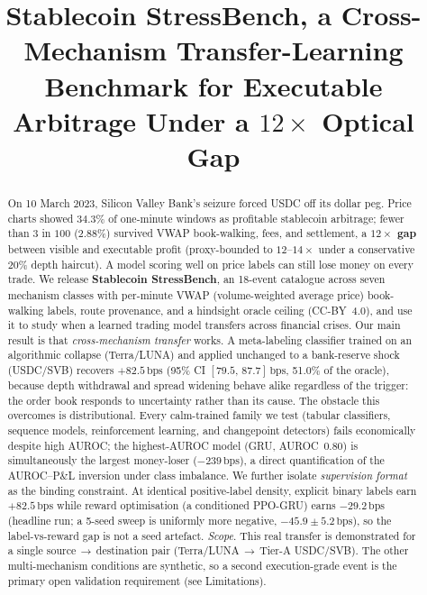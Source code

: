 \documentclass[sigconf,anonymous,natbib=false]{acmart}
\newcommand{\bps}{\,\text{bps}}
\begin{document}
\title{Stablecoin StressBench, a Cross-Mechanism Transfer-Learning\\
       Benchmark for Executable Arbitrage Under a \texorpdfstring{$12\times$}{12x} Optical Gap}

\begin{abstract}\sloppy
On 10 March 2023, Silicon Valley Bank's seizure forced USDC off its
dollar peg. Price charts showed $34.3\%$ of one-minute windows as
profitable stablecoin arbitrage; fewer than $3$ in $100$ ($2.88\%$)
survived VWAP book-walking, fees, and settlement, a \textbf{$12\times$
gap} between visible and executable profit (proxy-bounded to $12$--$14\times$
under a conservative $20\%$ depth haircut).  A model scoring well on
price labels can still lose money on every trade.
We release \textbf{Stablecoin StressBench}, an 18-event catalogue across
seven mechanism classes with per-minute VWAP (volume-weighted average
price) book-walking labels, route provenance, and a hindsight oracle
ceiling (CC-BY~4.0), and use it to study when a learned trading model
transfers across financial crises.
Our main result is that \emph{cross-mechanism transfer} works.
A meta-labeling classifier trained on an algorithmic collapse
(Terra/LUNA) and applied unchanged to a bank-reserve shock (USDC/SVB)
recovers $+82.5\bps$ (95\% CI $[79.5,\,87.7]\bps$, 51.0\% of the oracle),
because depth withdrawal and spread widening behave alike regardless of the
trigger: the order book responds to uncertainty rather than its cause.
The obstacle this overcomes is distributional. Every calm-trained family
we test (tabular classifiers, sequence models, reinforcement learning, and
changepoint detectors) fails economically despite high AUROC; the
highest-AUROC model (GRU, AUROC~0.80) is simultaneously the largest
money-loser ($-239\bps$), a direct quantification of the AUROC--P\&L
inversion under class imbalance.
We further isolate \emph{supervision format} as the binding constraint.
At identical positive-label density, explicit binary labels earn
$+82.5\bps$ while reward optimisation (a conditioned PPO-GRU) earns
$-29.2\bps$ (headline run; a 5-seed sweep is uniformly more negative,
$-45.9\pm5.2\bps$), so the label-vs-reward gap is not a seed artefact.
\emph{Scope}. This real transfer is demonstrated for a single
source$\,\to\,$destination pair (Terra/LUNA$\,\to\,$Tier-A USDC/SVB). The other
multi-mechanism conditions are synthetic, so a second execution-grade event is the
primary open validation requirement (see Limitations).
\end{abstract}
\end{document}
